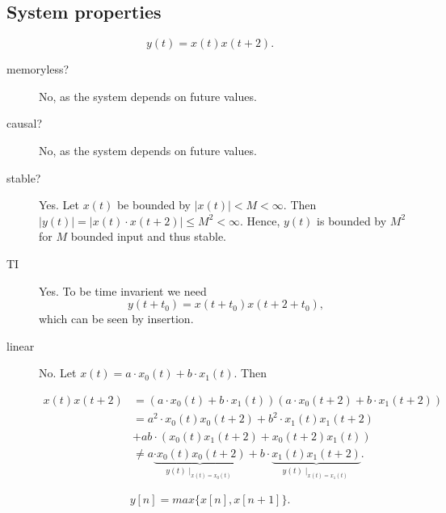 \subsection*{System properties}
\begin{equation}
    y(t) = x(t)x(t+2).
\end{equation}
\begin{description}
    \item[memoryless?] No, as the system depends on future values.
    \item[causal?] No, as the system depends on future values.
    \item[stable?] Yes. Let $x(t)$ be bounded by $|x(t)| < M < \infty$. Then 
    $|y(t)| = |x(t) \cdot x(t+2)| \leq M^2 < \infty$. Hence, $y(t)$ is bounded
    by $M^2$ for $M$ bounded input and thus stable.
    \item[TI] Yes. To be time invarient we need 
    \begin{equation}
        y(t + t_0) = x(t+t_0)x(t+2+t_0),
    \end{equation}
    which can be seen by insertion.

    \item[linear] No. Let $x(t) = a\cdot x_0(t) + b\cdot x_1(t)$. Then 

    \begin{align}
        x(t)x(t+2) &= (a\cdot x_0(t) + b\cdot x_1(t))
        (a\cdot x_0(t+2) + b\cdot x_1(t+2))\\
            &= a^2\cdot x_0(t)x_0(t+2) + b^2\cdot x_1(t)x_1(t+2) \nonumber\\
        &+ ab\cdot (x_0(t)x_1(t+2) + x_0(t+2)x_1(t))\\ 
            &\neq a\underbrace{\cdot x_0(t)x_0(t+2)}_{y(t)\mid _{x(t)=x_0(t)}}
        + b\cdot \underbrace{x_1(t)x_1(t+2)}_{y(t)\mid_{x(t) = x_1(t)}}.
    \end{align}
\end{description}

\begin{equation}
    y[n] = max\{x[n], x[n+1]\}.
\end{equation}

